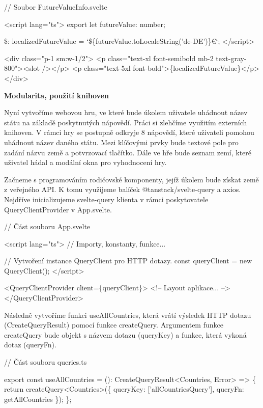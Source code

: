 \begin{prog}
// Soubor FutureValueInfo.svelte
  
<script lang="ts">
  export let futureValue: number;

  \$: localizedFutureValue = `\$\{futureValue.toLocaleString('de-DE')\}€`;
</script>

<div class="p-1 sm:w-1/2">
  <p class="text-xl font-semibold mb-2 text-gray-800"><slot /></p>
  <p class="text-5xl font-bold">\{localizedFutureValue\}</p>
</div>
\end{prog}

\begin{flushleft}
  \textbf{Modularita, použití knihoven}
\end{flushleft}

Nyní vytvoříme webovou hru, ve které bude úkolem uživatele uhádnout název státu na základě poskytnutých nápovědí. Práci si zlehčíme využitím externích knihoven. 
V rámci hry se postupně odkryje 8 nápovědí, které uživateli pomohou uhádnout název daného státu. Mezi klíčovými prvky bude textové pole pro zadání názvu země a potvrzovací tlačítko. 
Dále ve hře bude seznam zemí, které uživatel hádal a modální okna pro vyhodnocení hry.

Začneme s programováním rodičovské komponenty, jejíž úkolem bude získat země z veřejného API. K tomu využijeme balíček @tanstack/svelte-query a axios. 
Nejdříve inicializujeme svelte-query klienta v rámci poskytovatele QueryClientProvider v App.svelte.

\begin{prog}
// Část souboru App.svelte

<script lang="ts">
  // Importy, konstanty, funkce...  

  // Vytvoření instance QueryClient pro HTTP dotazy.
  const queryClient = new QueryClient();
</script>

<QueryClientProvider client=\{queryClient\}>
  <!-- Layout aplikace... -->
</QueryClientProvider>
\end{prog}

Následně vytvoříme funkci useAllCountries, která vrátí výsledek HTTP dotazu (CreateQueryResult) pomocí funkce createQuery. Argumentem funkce createQuery bude objekt s názvem dotazu (queryKey) a funkce, která vykoná dotaz (queryFn).

\begin{prog}
// Část souboru queries.ts

export const useAllCountries = (): CreateQueryResult<Countries, Error> => \{
  return createQuery<Countries>(\{
    queryKey: ['allCountriesQuery'], queryFn: getAllCountries
  \});
\};
\end{prog}


